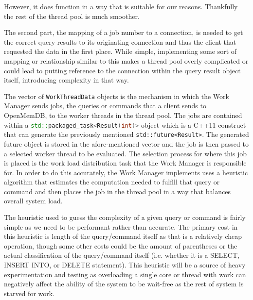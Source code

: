 \documentclass[letterpaper, 12pt]{article}
\begin{document}
  However, it does function in a way that is suitable for our reasons. Thankfully the rest of the thread
  pool is much smoother.
  \par\vspace{\baselineskip}
  The second part, the mapping of a job number to a connection, is needed to get the correct query results
  to its originating connection and thus the client that requested the data in the first place. While simple, 
  implementing some sort of mapping or relationship similar to this makes a thread pool overly complicated
  or could lead to putting reference to the connection within the query result object itself, introducing
  complexity in that way.
  \par\vspace{\baselineskip}
  The vector of \lstinline[]|WorkThreadData| objects is the mechanism in 
  which the Work Manager sends jobs, the queries or commands that a client sends to OpenMemDB, to the 
  worker threads in the thread pool. The jobs are contained within a \lstinline[language=C++]|std::packaged_task<Result(int)>|
  object which is a C++11 construct that can generate the previously mentioned \lstinline[basicstyle=\ttfamily]|std::future<Result>|.
  The generated future object is stored in the afore-mentioned vector and the job is then passed to a selected
  worker thread to be evaluated. The selection process for where this job is placed is the work load distribution
  task that the Work Manager is responsible for. In order to do this accurately, the Work Manager implements
  uses a heuristic algorithm that estimates the computation needed to fulfill that query or command
  and then places the job in the thread pool in a way that balances overall system load.
  \par\vspace{\baselineskip}
  The heuristic used to guess the complexity of a given query or command is fairly simple as we need to
  be performant rather than accurate. The primary cost in this heuristic is length of the query/command itself
  as that is a relatively cheap operation, though some other costs could be the amount of parentheses
  or the actual classification of the query/command itself (i.e. whether it is a SELECT, INSERT INTO, or DELETE statement).
  This heuristic will be a source of heavy experimentation and testing as overloading a single core or thread
  with work can negatively affect the ability of the system to be wait-free as the rest of system is 
  starved for work.
\newpage
\end{document}

